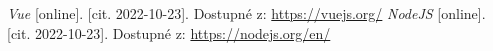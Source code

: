 \begin{thebibliography}{99}

  \textit{Vue} [online]. [cit. 2022-10-23]. Dostupné z: \url{https://vuejs.org/}
  \textit{NodeJS} [online]. [cit. 2022-10-23]. Dostupné z: \url{https://nodejs.org/en/}

\end{thebibliography}
